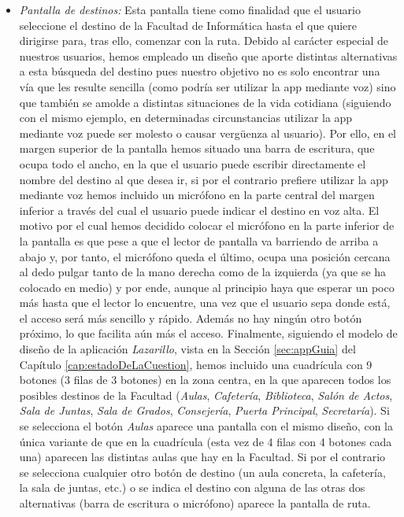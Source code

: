 \begin{itemize}
	\item \textit{Pantalla de destinos:} Esta pantalla tiene como finalidad que el usuario seleccione el destino de la Facultad de Informática hasta el que quiere dirigirse para, tras ello, comenzar con la ruta. Debido al carácter especial de nuestros usuarios, hemos empleado un diseño que aporte distintas alternativas a esta búsqueda del destino pues nuestro objetivo no es solo encontrar una vía que les resulte sencilla (como podría ser utilizar la app mediante voz) sino que también se amolde a distintas situaciones de la vida cotidiana (siguiendo con el mismo ejemplo, en determinadas circunstancias utilizar la app mediante voz puede ser molesto o causar vergüenza al usuario). Por ello, en el margen superior de la pantalla hemos situado una barra de escritura, que ocupa todo el ancho, en la que el usuario puede escribir directamente el nombre del destino al que desea ir, si por el contrario prefiere utilizar la app mediante voz hemos incluido un micrófono en la parte central del margen inferior a través del cual el usuario puede indicar el destino en voz alta. El motivo por el cual hemos decidido colocar el micrófono en la parte inferior de la pantalla es que pese a que el lector de pantalla va barriendo de arriba a abajo y, por tanto, el micrófono queda el último, ocupa una posición cercana al dedo pulgar tanto de la mano derecha como de la izquierda (ya que se ha colocado en medio) y por ende, aunque al principio haya que esperar un poco más hasta que el lector lo encuentre, una vez que el usuario sepa donde está, el acceso será más sencillo y rápido. Además no hay ningún otro botón próximo, lo que facilita aún más el acceso. Finalmente, siguiendo el modelo de diseño de la aplicación \textit{Lazarillo}, vista en la Sección \ref{sec:appGuia} del Capítulo \ref{cap:estadoDeLaCuestion}, hemos incluido una cuadrícula con 9 botones (3 filas de 3 botones) en la zona centra, en la que aparecen todos los posibles destinos de la Facultad (\textit{Aulas}, \textit{Cafetería}, \textit{Biblioteca}, \textit{Salón de Actos}, \textit{Sala de Juntas}, \textit{Sala de Grados}, \textit{Consejería},\textit{ Puerta Principal}, \textit{Secretaría}). Si se selecciona el botón \textit{Aulas} aparece una pantalla con el mismo diseño, con la única variante de que en la cuadrícula (esta vez de 4 filas con 4 botones cada una) aparecen las distintas aulas que hay en la Facultad. Si por el contrario se selecciona cualquier otro botón de destino (un aula concreta, la cafetería, la sala de juntas, etc.) o se indica el destino con alguna de las otras dos alternativas (barra de escritura o micrófono) aparece la pantalla de ruta.
	

\end{itemize}
